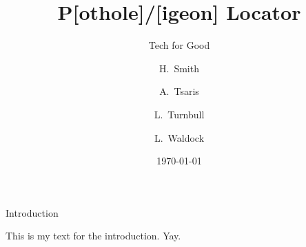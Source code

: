 \documentclass{beamer}
\title{P[othole]/[igeon] Locator}
\subtitle{Tech for Good}
\author[Smith, Tsaris, Turnbull, Waldock]{H.~Smith \and A.~Tsaris \and L.~Turnbull \and L.~Waldock}
\institute[5J]{Group 5J}
\date{\today}
\begin{document}
\frame{\titlepage}

\begin{frame}{Introduction}

    This is my text for the introduction. Yay.

\end{frame}
\end{document}
